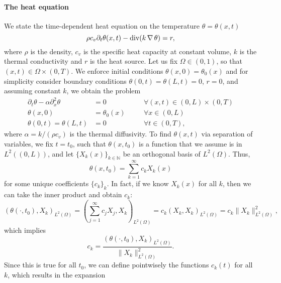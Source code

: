 \paragraph{The heat equation} We state the time-dependent heat equation on the temperature $\theta=\theta(x,t)$ 
\begin{equation}
    \rho c_v \partial_t \theta(x,t) - \operatorname{\text{div}} (k\operatorname{\nabla} \theta) = r,
\end{equation}
where $\rho$ is the density, $c_v$ is the specific heat capacity at constant volume, $k$ is the thermal conductivity and $r$ is the heat source. Let us fix $\Omega\in(0,1)$, so that $(x,t)\in\Omega\times(0,T)$. We enforce initial conditions $\theta(x,0)=\theta_0(x)$ and for simplicity consider boundary conditions $\theta(0,t) = \theta(L,t) = 0$, $r=0$, and assuming constant $k$, we obtain the problem 
\begin{equation}\label{eq:bvp-heat}
    \begin{aligned}
        \partial_t \theta - \alpha\partial_x^2\theta &= 0 &&\quad \forall (x,t)\in(0,L)\times(0,T)\\
        \theta(x,0) &= \theta_0(x) &&\quad \forall x\in(0,L)\\
        \theta(0,t) = \theta(L,t) &= 0 &&\quad \forall t\in (0,T),
    \end{aligned}
\end{equation}
where $\alpha = k/(\rho c_v)$ is the thermal diffusivity. To find $\theta(x,t)$ via separation of variables, we fix $t=t_0$, such that $\theta(x,t_0)$ is a function that we assume is in $L^2((0,L))$, and let $\{X_k(x)\}_{k\in\mathbb N}$ be an orthogonal basis of $L^2(\Omega)$. Thus,
\begin{equation}
    \theta(x,t_0) = \sum_{k=1}^\infty c_k X_k(x)
\end{equation}
for some unique coefficients $\{c_k\}_k$. In fact, if we know $X_k(x)$ for all $k$, then we can take the inner product and obtain $c_k$:
\begin{equation}
    (\theta(\cdot, t_0), X_k)_{L^2(\Omega)} = \left(\sum_{j=1}^\infty c_jX_j, X_k\right)_{L^2(\Omega)} = c_k(X_k,X_k)_{L^2(\Omega)} = c_k\|X_k\|_{L^2(\Omega)}^2,
\end{equation}
which implies 
\begin{equation}
    c_k = \frac{(\theta(\cdot, t_0), X_k)_{L^2(\Omega)}}{\|X_k\|_{L^2(\Omega)}^2}.
\end{equation}
Since this is true for all $t_0$, we can define pointwisely the functions $c_k(t)$ for all $k$, which results in the expansion 
